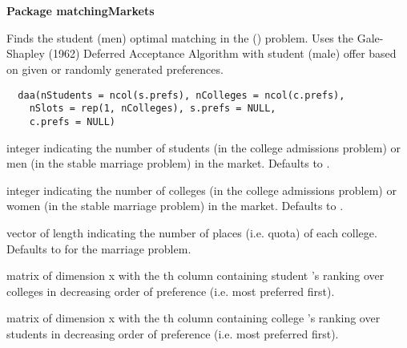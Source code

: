 \documentclass[letterpaper]{book}
\begin{document}
\chapter*{}
\begin{center}
{\textbf{\huge Package matchingMarkets}}
\par\bigskip{\large \today}
\end{center}
%
\begin{Description}\relax
Finds the student (men) optimal matching in the
() problem. Uses the Gale-Shapley (1962) Deferred
Acceptance Algorithm with student (male) offer based on
given or randomly generated preferences.
\end{Description}
%
\begin{Usage}
\begin{verbatim}
  daa(nStudents = ncol(s.prefs), nColleges = ncol(c.prefs),
    nSlots = rep(1, nColleges), s.prefs = NULL,
    c.prefs = NULL)
\end{verbatim}
\end{Usage}
%
\begin{Arguments}
\begin{ldescription}
\item[\code{nStudents}] integer indicating the number of
students (in the college admissions problem) or men (in
the stable marriage problem) in the market. Defaults to
.

\item[\code{nColleges}] integer indicating the number of
colleges (in the college admissions problem) or women (in
the stable marriage problem) in the market. Defaults to
.

\item[\code{nSlots}] vector of length 
indicating the number of places (i.e. quota) of each
college. Defaults to  for the
marriage problem.

\item[\code{s.prefs}] matrix of dimension  x
 with the th column containing
student 's ranking over colleges in decreasing
order of preference (i.e. most preferred first).

\item[\code{c.prefs}] matrix of dimension  x
 with the th column containing
college 's ranking over students in decreasing
order of preference (i.e. most preferred first).
\end{ldescription}
\end{Arguments}
\end{document}

